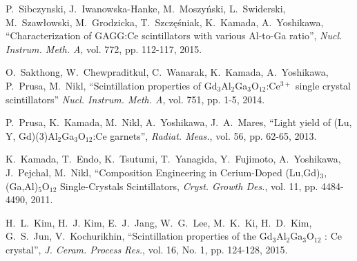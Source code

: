 \documentclass[journal]{IEEEtran}
\begin{document}
\begin{thebibliography}{1}
P.~Sibczynski, J.~Iwanowska-Hanke, M.~Moszy\'{n}ski, L.~Swiderski, M.~Szaw\l{}owski, M.~Grodzicka, T.~Szcz\k{e}\'{s}niak, K.~Kamada, A.~Yoshikawa, ``Characterization of GAGG:Ce scintillators with various Al-to-Ga ratio'', \emph{Nucl. Instrum. Meth. A}, vol. 772, pp. 112-117, 2015.

O.~Sakthong, W.~Chewpraditkul, C.~Wanarak, K.~Kamada, A.~Yoshikawa, P.~Prusa, M.~Nikl, ``Scintillation properties of Gd$_{3}$Al$_{2}$Ga$_{3}$O$_{12}$:Ce$^{3+}$ single crystal scintillators'' \emph{Nucl.  Instrum. Meth. A}, vol. 751, pp. 1-5, 2014. 

P.~Prusa, K.~Kamada, M.~Nikl, A.~Yoshikawa, J.~A.~Mares, ``Light yield of (Lu, Y, Gd)(3)Al$_{2}$Ga$_{3}$O$_{12}$:Ce garnets'', \emph{Radiat. Meas.}, vol. 56, pp. 62-65, 2013. 

K.~Kamada, T.~Endo, K.~Tsutumi, T.~Yanagida, Y.~Fujimoto, A.~Yoshikawa, J.~Pejchal, M.~Nikl, ``Composition Engineering in Cerium-Doped (Lu,Gd)$_{3}$,(Ga,Al)$_{5}$O$_{12}$ Single-Crystals Scintillators, \emph{Cryst. Growth Des.}, vol. 11, pp. 4484-4490, 2011.

H.~L.~Kim, H.~J. Kim, E.~J.~Jang, W.~G.~Lee, M.~K.~Ki, H.~D.~Kim, G.~S.~Jun, V.~Kochurikhin, ``Scintillation properties of the Gd$_{3}$Al$_{2}$Ga$_{3}$O$_{12}$ : Ce crystal'', \emph{J. Ceram. Process Res.}, vol. 16, No. 1, pp. 124-128, 2015.

%
%
%

\end{thebibliography}
\end{document}
